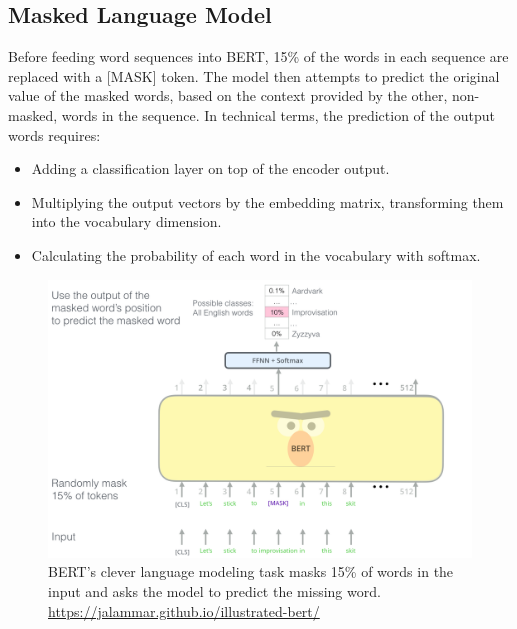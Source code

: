 \subsection{Masked Language Model}
Before feeding word sequences into BERT, 15{\%} of the words in each sequence are replaced with a [MASK] token. The model then attempts to predict the original value of the masked words, based on the context provided by the other, non-masked, words in the sequence. In technical terms, the prediction of the output words requires:
\begin{itemize}
\item Adding a classification layer on top of the encoder output.
\item Multiplying the output vectors by the embedding matrix, transforming them into the vocabulary dimension.
\item Calculating the probability of each word in the vocabulary with softmax.
\end{itemize}

\begin{figure}[h]
\centering
\includegraphics[width=1\textwidth]{BERT-language-modeling-masked-lm.png}
\caption{BERT's clever language modeling task masks 15{\%} of words in the input and asks the model to predict the missing word. \url{https://jalammar.github.io/illustrated-bert/}}
\label{fig:MLM}
\end{figure}

\clearpage
